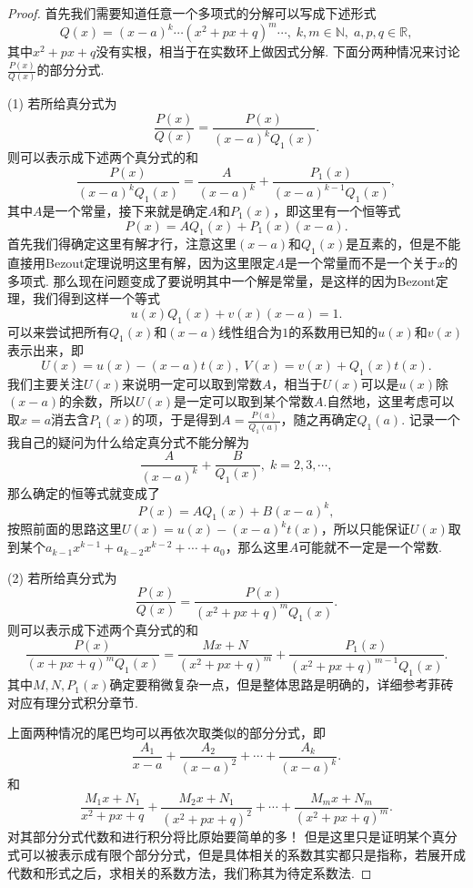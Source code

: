 \documentclass{article}
\begin{document}
\begin{proof}
首先我们需要知道任意一个多项式的分解可以写成下述形式
$$
Q(x) = (x-a)^k \cdots (x^2+px+q)^m \cdots,\; k,m \in \mathbb{N},\; a,p,q \in \mathbb{R},
$$
其中$x^2+px+q$没有实根，相当于在实数环上做因式分解. 下面分两种情况来讨论$\frac{P(x)}{Q(x)}$的部分分式. 

{\color{blue}(1)} 若所给真分式为
$$
\frac{P(x)}{Q(x)} = \frac{P(x)}{(x-a)^kQ_1(x)}.
$$
则可以表示成下述两个真分式的和
$$
\frac{P(x)}{(x-a)^kQ_1(x)} = \frac{A}{(x-a)^k} + \frac{P_1(x)}{(x-a)^{k-1}Q_1(x)},
$$
其中$A$是一个常量，接下来就是确定$A$和$P_1(x)$，即这里有一个恒等式
$$
P(x) = AQ_1(x) + P_1(x)(x-a).
$$
首先我们得确定这里有解才行，{\color{blue}注意这里$(x-a)$和$Q_1(x)$是互素的，但是不能直接用Bezout定理说明这里有解，因为这里限定$A$是一个常量而不是一个关于$x$的多项式}. 那么现在问题变成了要说明其中一个解是常量，是这样的因为Bezont定理，我们得到这样一个等式
$$
u(x)Q_1(x) + v(x)(x-a) = 1.
$$
可以来尝试把所有$Q_1(x)$和$(x-a)$线性组合为$1$的系数用已知的$u(x)$和$v(x)$表示出来，即
$$
U(x) = u(x) - (x-a)t(x),\; V(x) = v(x) + Q_1(x)t(x). 
$$
我们主要关注$U(x)$来说明一定可以取到常数$A$，相当于$U(x)$可以是$u(x)$除$(x-a)$的余数，所以$U(x)$是一定可以取到某个常数$A$.自然地，这里考虑可以取$x = a$消去含$P_1(x)$的项，于是得到$A=\frac{P(a)}{Q_1(a)}$，随之再确定$Q_1(a)$. 记录一个我自己的疑问{\color{red}为什么给定真分式不能分解为}
$$
\frac{A}{(x-a)^k} + \frac{B}{Q_1(x)},\; k=2,3,\cdots,
$$
那么确定的恒等式就变成了
$$
P(x) = AQ_1(x) + B(x-a)^k, 
$$
按照前面的思路这里$U(x) = u(x) - (x-a)^kt(x)$，所以只能保证$U(x)$取到某个$a_{k-1}x^{k-1}+a_{k-2}x^{k-2}+\cdots+a_0$，那么这里$A$可能就不一定是一个常数.

{\color{blue}(2)} 若所给真分式为
$$
\frac{P(x)}{Q(x)} = \frac{P(x)}{(x^2+px+q)^mQ_1(x)}.
$$
则可以表示成下述两个真分式的和
$$
\frac{P(x)}{(x+px+q)^mQ_1(x)} = \frac{Mx+N}{(x^2+px+q)^m} + \frac{P_1(x)}{(x^2+px+q)^{m-1}Q_1(x)}.
$$
其中$M,N,P_1(x)$确定要稍微复杂一点，但是整体思路是明确的，详细参考菲砖对应有理分式积分章节.

上面两种情况的尾巴均可以再依次取类似的部分分式，即
$$
\frac{A_1}{x-a} + \frac{A_2}{(x-a)^2} + \cdots + \frac{A_k}{(x-a)^k}.
$$
和
$$
\frac{M_1x+N_1}{x^2+px+q} + \frac{M_2x+N_1}{(x^2+px+q)^2} + \cdots + \frac{M_{m}x+N_{m}}{(x^2+px+q)^m}.
$$
对其部分分式代数和进行积分将比原始要简单的多！ 但是这里只是证明某个真分式可以被表示成有限个部分分式，但是具体相关的系数其实都只是指称，若展开成代数和形式之后，求相关的系数方法，我们称其为{\color{red}待定系数法}.
\end{proof}
\end{document}
